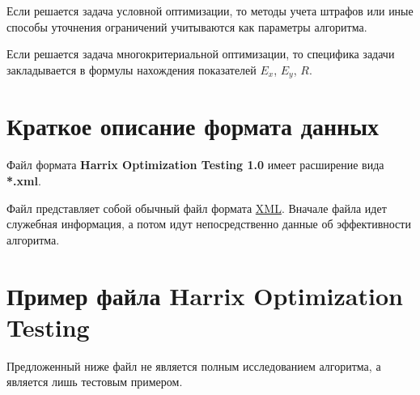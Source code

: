 \documentclass[a4paper,12pt]{article}
\begin{document}
Если решается задача условной оптимизации, то методы учета штрафов или иные способы уточнения ограничений учитываются как параметры алгоритма.

Если решается задача многокритериальной оптимизации, то специфика задачи закладывается в формулы нахождения показателей $ E_x $, $ E_y $, $ R $.

\section{Краткое описание формата данных}

Файл формата \textbf{Harrix Optimization Testing 1.0} имеет расширение вида \textbf{*.xml}.

Файл представляет собой обычный файл формата \href {http://ru.wikipedia.org/wiki/XML} {XML}. Вначале файла идет служебная информация, а потом идут непосредственно данные об эффективности алгоритма.

\section{Пример файла Harrix Optimization Testing}

Предложенный ниже файл не является полным исследованием алгоритма, а является лишь тестовым примером.
\end{document}
